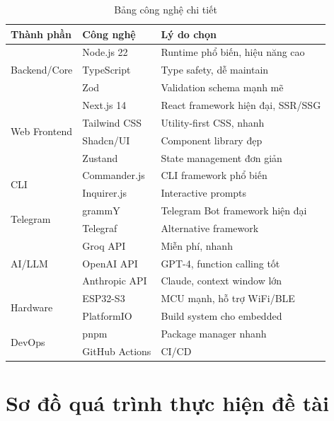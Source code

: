 \documentclass[12pt,a4paper]{article}
\begin{document}
\begin{table}[H]
    \centering
    \begin{tabular}{|l|l|p{6cm}|}
        \hline
        \textbf{Thành phần} & \textbf{Công nghệ} & \textbf{Lý do chọn} \\
        \hline
        \multirow{3}{*}{Backend/Core} 
        & Node.js 22 & Runtime phổ biến, hiệu năng cao \\
        & TypeScript & Type safety, dễ maintain \\
        & Zod & Validation schema mạnh mẽ \\
        \hline
        \multirow{4}{*}{Web Frontend}
        & Next.js 14 & React framework hiện đại, SSR/SSG \\
        & Tailwind CSS & Utility-first CSS, nhanh \\
        & Shadcn/UI & Component library đẹp \\
        & Zustand & State management đơn giản \\
        \hline
        \multirow{2}{*}{CLI}
        & Commander.js & CLI framework phổ biến \\
        & Inquirer.js & Interactive prompts \\
        \hline
        \multirow{2}{*}{Telegram}
        & grammY & Telegram Bot framework hiện đại \\
        & Telegraf & Alternative framework \\
        \hline
        \multirow{3}{*}{AI/LLM}
        & Groq API & Miễn phí, nhanh \\
        & OpenAI API & GPT-4, function calling tốt \\
        & Anthropic API & Claude, context window lớn \\
        \hline
        \multirow{2}{*}{Hardware}
        & ESP32-S3 & MCU mạnh, hỗ trợ WiFi/BLE \\
        & PlatformIO & Build system cho embedded \\
        \hline
        \multirow{2}{*}{DevOps}
        & pnpm & Package manager nhanh \\
        & GitHub Actions & CI/CD \\
        \hline
    \end{tabular}
    \caption{Bảng công nghệ chi tiết}
\end{table}

\section{Sơ đồ quá trình thực hiện đề tài}
\end{document}
